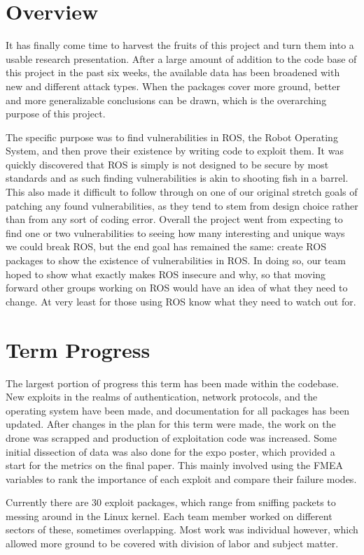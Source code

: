 \documentclass[IEEEtran,letterpaper,10pt,notitlepage,draftclsnofoot,onecolumn]{article}
\begin{document}
\section{Overview}
It has finally come time to harvest the fruits of this project and turn them into a usable research presentation.
After a large amount of addition to the code base of this project in the past six weeks, the available data has been broadened with new and different attack types.
When the packages cover more ground, better and more generalizable conclusions can be drawn, which is the overarching purpose of this project.

The specific purpose was to find vulnerabilities in ROS, the Robot Operating System, and then prove their existence by writing code to exploit them. 
It was quickly discovered that ROS is simply is not designed to be secure by most standards and as such finding vulnerabilities is akin to shooting fish in a barrel. 
This also made it difficult to follow through on one of our original stretch goals of patching any found vulnerabilities, as they tend to stem from design choice rather than from any sort of coding error. 
Overall the project went from expecting to find one or two vulnerabilities to seeing how many interesting and unique ways we could break ROS, but the end goal has remained the same: create ROS packages to show the existence of vulnerabilities in ROS. 
In doing so, our team hoped to show what exactly makes ROS insecure and why, so that moving forward other groups working on ROS would have an idea of what they need to change.
At very least for those using ROS know what they need to watch out for.

\section{Term Progress}
The largest portion of progress this term has been made within the codebase.
New exploits in the realms of authentication, network protocols, and the operating system have been made, and documentation for all packages has been updated.
After changes in the plan for this term were made, the work on the drone was scrapped and production of exploitation code was increased.
Some initial dissection of data was also done for the expo poster, which provided a start for the metrics on the final paper.
This mainly involved using the FMEA variables to rank the importance of each exploit and compare their failure modes.

Currently there are 30 exploit packages, which range from sniffing packets to messing around in the Linux kernel.
Each team member worked on different sectors of these, sometimes overlapping.
Most work was individual however, which allowed more ground to be covered with division of labor and subject matter.
\end{document}
